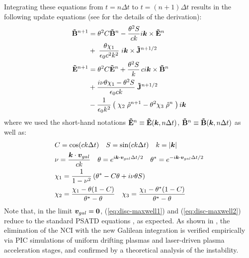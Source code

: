 Integrating these equations from $t=n\Delta
t$ to $t=(n+1)\Delta t$ results in the following update equations (see
\cite{LeheARXIV2016} for the details of the derivation):
%
\begin{subequations}
\begin{align}
\mathbf{\tilde{B}}^{n+1} &= \theta^2 C \mathbf{\tilde{B}}^n
 -\frac{\theta^2 S}{ck}i\boldsymbol{k}\times \mathbf{\tilde{E}}^n \nonumber \\
& + \;\frac{\theta \chi_1}{\epsilon_0c^2k^2}\;i\boldsymbol{k} \times
                     \mathbf{\tilde{J}}^{n+1/2} \label{eq:disc-maxwell1}\\
\mathbf{\tilde{E}}^{n+1} &=  \theta^2 C  \mathbf{\tilde{E}}^n
 +\frac{\theta^2 S}{k} \,c i\boldsymbol{k}\times \mathbf{\tilde{B}}^n \nonumber \\
& +\frac{i\nu \theta \chi_1 - \theta^2S}{\epsilon_0 ck} \; \mathbf{\tilde{J}}^{n+1/2}\nonumber \\
& - \frac{1}{\epsilon_0k^2}\left(\; \chi_2\;\hat{\mathcal{\rho}}^{n+1} -
  \theta^2\chi_3\;\hat{\mathcal{\rho}}^{n} \;\right) i\boldsymbol{k} \label{eq:disc-maxwell2}
\end{align}
\end{subequations}
%
where we used the short-hand notations $\fe^n \equiv
%
\fe(\vec{k}, n\Delta t)$, $\mathbf{\tilde{B}}^n \equiv
\mathbf{\tilde{B}}(\boldsymbol{k}, n\Delta t)$ as well as:
\begin{subequations}
\begin{align}
&C = \cos(ck\Delta t) \quad S = \sin(ck\Delta t) \quad k
= |\boldsymbol{k}| \label{eq:def-C-S}\\&
\nu = \frac{\boldsymbol{k}\cdot\boldsymbol{v}_{gal}}{ck} \quad \theta =
  e^{i\boldsymbol{k}\cdot\boldsymbol{v}_{gal}\Delta t/2} \quad \theta^* =
  e^{-i\boldsymbol{k}\cdot\boldsymbol{v}_{gal}\Delta t/2} \label{eq:def-nu-theta}\\&
\chi_1 =  \frac{1}{1 -\nu^2} \left( \theta^* -  C \theta + i
  \nu \theta S \right) \label{eq:def-chi1}\\&
\chi_2 = \frac{\chi_1 - \theta(1-C)}{\theta^*-\theta} \quad
\chi_3 = \frac{\chi_1-\theta^*(1-C)}{\theta^*-\theta} \label{eq:def-chi23}
\end{align}
\end{subequations}
Note that, in the limit $\boldsymbol{v}_{gal}=\boldsymbol{0}$,
(\ref{eq:disc-maxwell1}) and (\ref{eq:disc-maxwell2}) reduce to the standard PSATD
equations \cite{Habericnsp73}, as expected.
As shown in \cite{KirchenARXIV2016,LeheARXIV2016},
the elimination of the NCI with the new Galilean integration is verified empirically via PIC simulations of uniform drifting plasmas and laser-driven plasma acceleration stages, and confirmed by a theoretical analysis of the instability.

